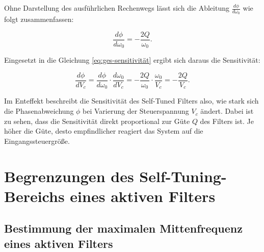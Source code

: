 \documentclass[../main.tex]{subfiles}
\begin{document}
\medskip

Ohne Darstellung des ausführlichen Rechenwegs lässt sich die Ableitung $\frac{d \phi}{d \omega_0}$ wie folgt zusammenfassen:

\begin{equation}
  \frac{d \phi}{d \omega_0}= -\frac{2Q}{\omega_0}.
\end{equation}

Eingesetzt in die Gleichung \eqref{eq:ges-sensitivität} ergibt sich daraus die Sensitivität:

\begin{equation}
  \frac{d \phi}{d V_c} = \frac{d \phi}{d \omega_0} \cdot \frac{d \omega_0}{d V_c} = - \frac{2Q}{\omega_0} \cdot \frac{\omega_0}{V_c}=-\frac{2Q}{V_c}.
\end{equation}

Im Enteffekt beschreibt die Sensitivität des Self-Tuned Filters also, wie stark sich die Phasenabweichung $\phi$ bei Varierung der Steuerspannung $V_c$ ändert. Dabei ist zu sehen, dass die Sensitivität direkt proportional zur Güte $Q$ des Filters ist. Je höher die Güte, desto empfindlicher reagiert das System auf die Eingangssteuergröße.


\section{Begrenzungen des Self-Tuning-Bereichs eines aktiven Filters}

\subsection{Bestimmung der maximalen Mittenfrequenz eines aktiven Filters}
\end{document}
